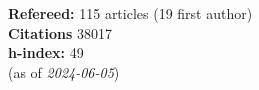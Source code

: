 \textbf{Refereed:} 115 articles (19 first author)\\\textbf{Citations} 38017\\\textbf{h-index:} 49\\(as of \textit{2024-06-05})